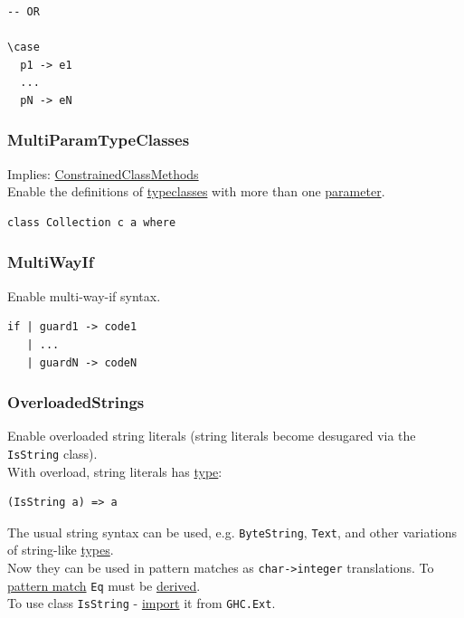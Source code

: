 \documentclass[a4paper,14pt,oneside]{book}
\begin{document}
{\begin{verbatim}
-- OR

\case
  p1 -> e1
  ...
  pN -> eN
\end{verbatim}

\subsubsection{\label{orgc4f818f}MultiParamTypeClasses}
\label{sec:org125ddbb}
Implies: \hyperref[org40e4ef5]{ConstrainedClassMethods}\\
Enable the definitions of \hyperref[orge92de38]{typeclasses} with more than one \hyperref[org0db8baa]{parameter}.\\
\begin{verbatim}
class Collection c a where
\end{verbatim}

\subsubsection{\label{org239c4a2}MultiWayIf}
\label{sec:orgaca5daa}
Enable multi-way-if syntax.\\
\begin{verbatim}
if | guard1 -> code1
   | ...
   | guardN -> codeN
\end{verbatim}

\subsubsection{\label{org97fcee3}OverloadedStrings}
\label{sec:org6b2d8e3}
Enable overloaded string literals (string literals become desugared via the \texttt{IsString} class).\\

With overload, string literals has \hyperref[orga9ca243]{type}:\\
\begin{verbatim}
(IsString a) => a
\end{verbatim}

The usual string syntax can be used, e.g. \texttt{ByteString}, \texttt{Text}, and other variations of string-like \hyperref[org51532d9]{types}.\\
Now they can be used in pattern matches as \texttt{char->integer} translations. To \hyperref[org8c05feb]{pattern match} \texttt{Eq} must be \hyperref[org24d66fc]{derived}.\\

To use class \texttt{IsString} - \hyperref[org7dc0f80]{import} it from \texttt{GHC.Ext}.\\

}
\end{document}

